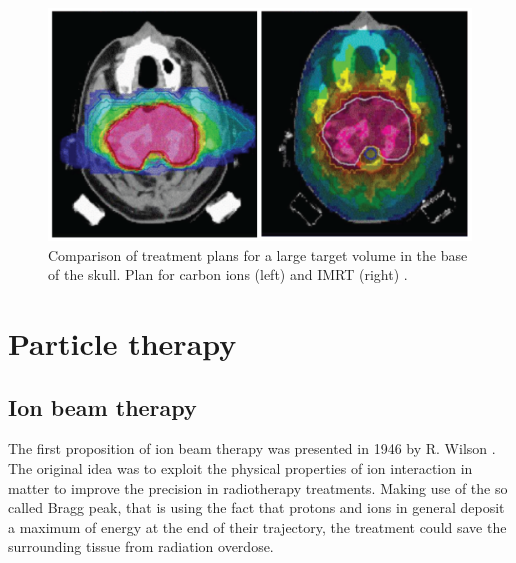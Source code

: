\begin{figure}
\centering
\includegraphics[width=12cm]{Pictures/Chapter_1/treat_conf2.pdf}
\caption[X-ray and proton irradiation]{Comparison of treatment plans for a large target volume in the base of the skull. Plan for carbon ions (left) and IMRT (right) \cite{Durante2010}.}
\label{fig:irradiation}
\end{figure}

\section{Particle therapy}
\subsection{Ion beam therapy}

The first proposition of ion beam therapy was presented in 1946 by R. Wilson \cite{Wilson1946}. The original idea was to exploit the physical properties of ion interaction in matter to improve the precision in radiotherapy treatments.  
Making use of the so called Bragg peak, that is using the fact that protons and ions in general deposit a maximum of energy at the end of their trajectory, the treatment could save the surrounding tissue from radiation overdose.

